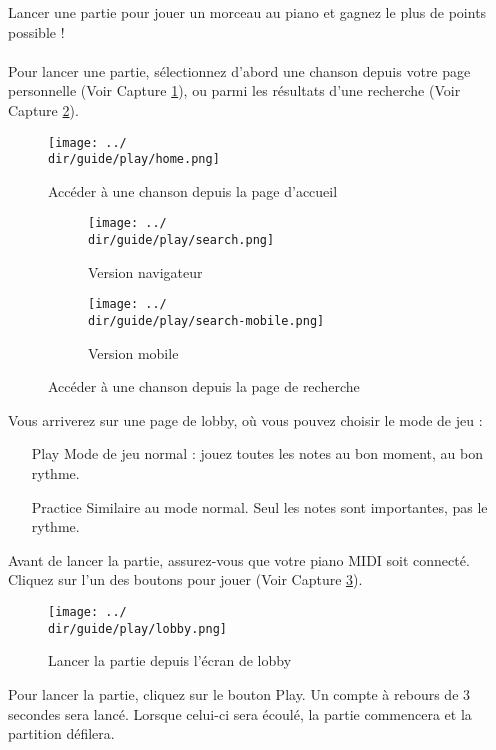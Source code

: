 Lancer une partie pour jouer un morceau au piano et gagnez le plus de points possible !
\\\\
Pour lancer une partie, sélectionnez d’abord une chanson depuis votre page personnelle (Voir Capture \ref{fig:access-song}), ou parmi les résultats d’une recherche (Voir Capture \ref{fig:search-song}).

\begin{figure}[H]
	\texttt{[image: ../\\dir/guide/play/home.png]}
	\caption{Accéder à une chanson depuis la page d'accueil}
	\label{fig:access-song}
\end{figure}

\begin{figure}[H]
	\begin{subfigure}[b]{0.7\textwidth}
		\texttt{[image: ../\\dir/guide/play/search.png]}
		\caption{Version navigateur}
	\end{subfigure}
	\begin{subfigure}[b]{0.25\textwidth}
		\texttt{[image: ../\\dir/guide/play/search-mobile.png]}
		\caption{Version mobile}
	\end{subfigure}
	\caption{Accéder à une chanson depuis la page de recherche}
	\label{fig:search-song}
\end{figure}

Vous arriverez sur une page de lobby, où vous pouvez choisir le mode de jeu :

\begin{itemize}
	\item[Play] Mode de jeu normal : jouez toutes les notes au bon moment, au bon rythme.
	\item[Practice] Similaire au mode normal. Seul les notes sont importantes, pas le rythme.
\end{itemize}

Avant de lancer la partie, assurez-vous que votre piano MIDI soit connecté.
Cliquez sur l'un des boutons pour jouer (Voir Capture \ref{fig:choose-play-mode}).

\begin{figure}[H]
	\texttt{[image: ../\\dir/guide/play/lobby.png]}
	\caption{Lancer la partie depuis l'écran de lobby}
	\label{fig:choose-play-mode}
\end{figure}

Pour lancer la partie, cliquez sur le bouton Play. Un compte à rebours de 3 secondes sera lancé. Lorsque celui-ci sera écoulé, la partie commencera et la partition défilera.

